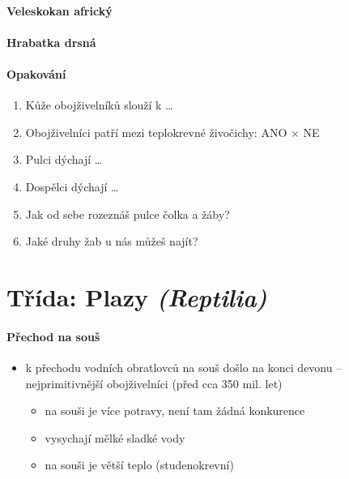 \paragraph{Veleskokan africký}

\paragraph{Hrabatka drsná}


\paragraph{Opakování}
\begin{enumerate}
\item Kůže obojživelníků slouží k \ldots
\item Obojživelníci patří mezi teplokrevné živočichy: ANO $\times$ NE
\item Pulci dýchají \ldots
\item Dospělci dýchají \ldots
\item Jak od sebe rozeznáš pulce čolka a žáby?
\item Jaké druhy žab u nás můžeš najít?
\end{enumerate}

\section{Třída: Plazy \textit{(Reptilia)}}
\paragraph{Přechod na souš}
\begin{itemize}
\item k přechodu vodních obratlovců na souš došlo na konci devonu -- nejprimitivnější obojživelníci (před cca 350 mil. let)
	\begin{itemize}
	\item na souši je více potravy, není tam žádná konkurence
	\item vysychají mělké sladké vody
	\item na souši je větší teplo (studenokrevní)
	\end{itemize}
\end{itemize}

